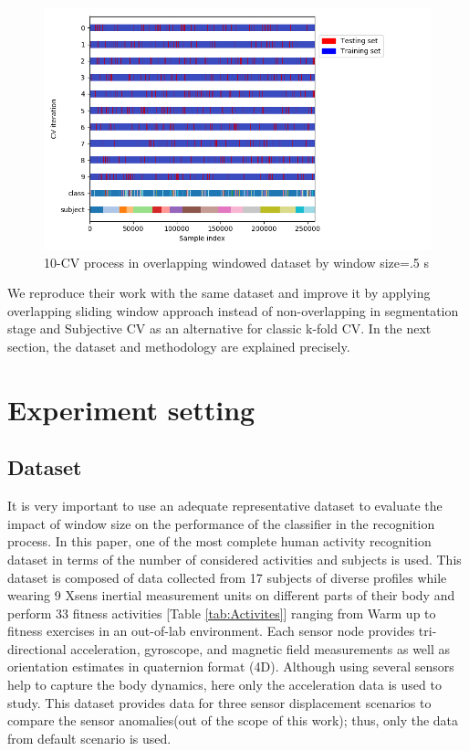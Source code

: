 \begin{itemize}
\begin{figure}[h]
    \centering
    \includegraphics[width=.5\textwidth]{Figures/ShuffleSplit.png}
    \caption{10-CV process in overlapping windowed dataset by window size=.5 s }
    \label{fig:Shuffle-cv}
\end{figure}

\end{itemize}

We reproduce their work with the same dataset and improve it by applying overlapping sliding window approach instead of non-overlapping in segmentation stage and Subjective CV as an alternative for classic k-fold CV. In the next section, the dataset and methodology are explained precisely.

\section{Experiment setting}

\subsection{Dataset} \label{sec:dataset}
It is very important to use an adequate representative dataset to evaluate the impact of window size on the performance of the classifier in the recognition process. In this paper, one of the most complete human activity recognition dataset \cite{banos2012benchmark} in terms of the number of considered activities and subjects is used. This dataset is composed of data collected from 17 subjects of diverse profiles while wearing 9 Xsens inertial measurement units on different parts of their body and perform 33 fitness activities [Table \ref{tab:Activites}] ranging from Warm up to fitness exercises in an out-of-lab environment. Each sensor node provides tri-directional acceleration, gyroscope, and magnetic field
measurements as well as orientation estimates in quaternion format (4D). Although using several sensors help to capture the body dynamics, here only the acceleration data is used to study. This dataset provides data for three sensor displacement scenarios to compare the sensor anomalies(out of the scope of this work); thus, only the data from default scenario is used.

